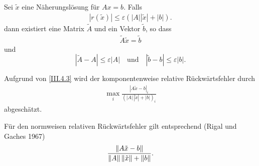 \begin{Satze}\label{3.4.1}
  Sei $\tilde{ x}$ eine Näherungslösung für 
  $  A  x =  b$. 
  Falls
  \begin{gather}\label{III.4.3}
    |  r(\tilde { x})| \leq \varepsilon ( | A| | \tilde { x} | + |  b|).
  \end{gather}
  dann existiert eine Matrix $\tilde{ A}$  und ein
  Vektor $\tilde { b}$, so dass
  \begin{gather*}
    \tilde{ A} \tilde { x}  =  \tilde{ b} 
  \end{gather*}
  und
  \begin{equation}
    |\tilde{ A} -  A |  \leq  \varepsilon | A|
    \quad \textrm{und} \quad | \tilde{ b} -  b| \leq
    \varepsilon | b|.
    \label{III.4.4}
  \end{equation}
  
  Aufgrund von \eqref{III.4.3} wird der komponentenweise relative
  Rückwärtsfehler durch 
  \begin{gather*}
    \max_i \frac{|  A \tilde{ x} -  b|_i}
    { (| A|\, |\tilde{ x}| + | b|)_i} 
  \end{gather*}
  abgeschätzt.
  
  Für den normweisen relativen Rückwärtsfehler gilt entsprechend
  (Rigal und Gaches 1967)
  \begin{gather*}
    \frac{\left\|   A \tilde{ x} -  b \right\|}
    { \left\|  A \right\| \left\| \tilde{ x}  \right\| + \left\|  b \right\| } .
  \end{gather*}
\end{Satze}


